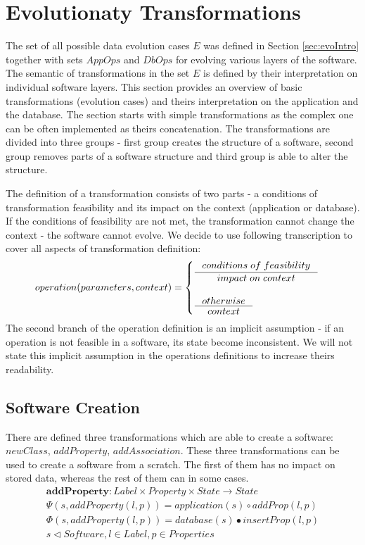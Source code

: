 \documentclass[11pt]{article}
\begin{document}
\section{Evolutionaty Transformations}
The set of all possible data evolution cases $E$ was defined in Section \ref{sec:evoIntro} together with sets $AppOps$ and $DbOps$ for evolving various layers of the software. The semantic of transformations in the set $E$ is defined by their interpretation on individual software layers. This section provides an overview of basic transformations (evolution cases) and theirs interpretation on the application and the database. The section starts with simple transformations as the complex one can be often implemented as theirs concatenation. The transformations are divided into three groups - first group creates the structure of a software, second group removes parts of a software structure and third group is able to alter the structure.

The definition of a transformation consists of two parts - a conditions of transformation feasibility and its impact on the context (application or database). If the conditions of feasibility are not met, the transformation cannot change the context - the software cannot evolve.  We decide to use following transcription to cover all aspects of transformation definition:
\begin{align*}
operation(parameters, context) = \begin{cases}
  \inference{conditions \; of \; feasibility}{impact \; on \; context}\\ \\
  \inference{otherwise}{context}
 \end{cases}
\end{align*}
The second branch of the operation definition is an implicit assumption - if an operation is not feasible in a software, its state become inconsistent. We will not state this implicit assumption in the operations definitions to increase theirs readability.


\subsection{Software Creation}
There are defined three transformations which are able to create a software: $newClass$, $addProperty$, $addAssociation$. These three transformations can be used to create a software from a scratch. The first of them has no impact on stored data, whereas the rest of them can in some cases.
\begin{align*}
\mathbf{addProperty} : Label \times Property \times State \rightarrow State \\
\Psi(s, addProperty(l, p)) = application(s) \circ addProp(l,p) \\
\Phi(s, addProperty(l, p)) = database(s) \bullet insertProp(l, p) \\
s \lhd Software, l \in Label, p \in Properties
\end{align*}
\end{document}

